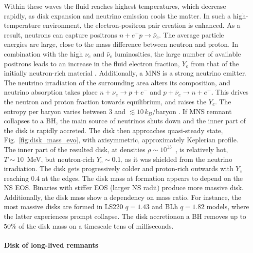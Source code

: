 Within these waves the fluid reaches highest temperatures, which decrease rapidly, as 
disk expansion and neutrino emission cools the matter. 
In such a high-temperature environment, the electron-positron pair creation is enhanced.
As a result, neutrons can capture positrons $n+e^+p\rightarrow\bar{\nu}_e$.
The average particle energies are large, close to the mass difference between neutron 
and proton. 
In combination with the high $\nu_e$ and $\bar{\nu}_e$ luminosities,
the large number of available positrons leads to an increase 
in the fluid electron fraction, $Y_e$ from that of the initially neutron-rich material
\citep{Qian:1996xt}.
Additionally, a \ac{MNS} is a strong neutrino emitter. The neutrino irradiation of the 
surrounding area alters its composition, and neutrino absorption takes place
$n+\nu_e\rightarrow p + e^{-}$ and $p + \bar{\nu}_e\rightarrow n + e^+$.
This drives the neutron and proton fraction towards equilibrium, and raises the $Y_e$.
The entropy per baryon varies between $3$ and $\lesssim 10\,$$k_{B}$/baryon \citep{Perego:2019adq}.
If \ac{MNS} remnant collapses to a BH, the main source of neutrinos shuts down and 
the inner part of the disk is rapidly accreted. 
The disk then approaches quasi-steady state, Fig.~\ref{fig:disk_mass_evo}, with 
axisymmetric, approximately Keplerian profile.
The inner part of the resulted disk, at densities $\rho\sim10^{13}$~\gcm, 
is relatively hot, $T\sim10\,$ MeV, but neutron-rich $Y_e\sim0.1$, as it was shielded 
from the neutrino irradiation. The disk gets progressively colder and proton-rich 
outwards with $Y_e$ reaching $0.4$ at the edges.
The disk mass at formation appears to depend on the \ac{NS} \ac{EOS}. Binaries with 
stiffer EOS (larger \ac{NS} radii) produce more massive disk.
Additionally, the disk mass show a dependency on mass ratio. For instance, the most massive disks are formed in LS220 $q=1.43$ and  BLh $q=1.82$ models, where the latter experiences prompt collapse.
The disk accretionon a \ac{BH} removes up to $50\%$ of the disk mass on a timescale tens of milliseconds.


\paragraph*{Disk of long-lived remnants}


